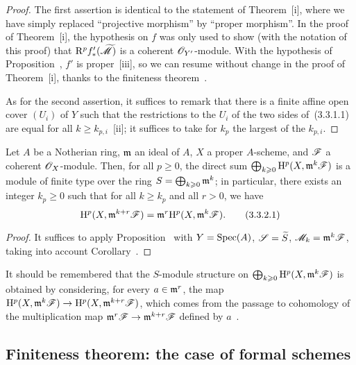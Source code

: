 \begin{proof}
\label{proof-3.3.3.1}
The first assertion is identical to the statement of Theorem~[i], where we have simply replaced ``projective morphism'' by ``proper morphism''.
In the proof of Theorem~[i], the hypothesis on $f$ was only used to show (with the notation of this proof) that $\mathrm{R}^p f_*'({\widetilde{\mathscr{M}}})$ is a coherent $\mathscr{O}_{Y'}$-module.
With the hypothesis of Proposition~, $f'$ is proper~[iii], so we can resume without change in the proof of Theorem~[i], thanks to the finiteness theorem~.

As for the second assertion, it suffices to remark that there is a finite affine open cover $(U_i)$ of $Y$ such that the restrictions to the $U_i$ of the two sides of~(3.3.1.1) are equal for all $k\geq k_{p,i}$~[ii]; it suffices to take for $k_p$ the largest of the $k_{p,i}$.
\end{proof}

\begin{cor}[3.3.2]
\label{3.3.3.2}
Let $A$ be a Notherian ring, $\mathfrak{m}$ an ideal of $A$, $X$ a proper $A$-scheme, and $\mathscr{F}$ a coherent $\mathscr{O}_X$-module.
Then, for all $p\geq 0$, the direct sum $\bigoplus_{k\geqslant 0}\mathrm{H}^p(X,\mathfrak{m}^k\mathscr{F})$ is a module of finite type over the ring $S=\bigoplus_{k\geqslant 0}\mathfrak{m}^k$; in particular, there exists an integer $k_p\geq 0$ such that for all $k\geq k_p$ and all $r>0$, we have
\[
\label{3.3.3.2.1}
  \mathrm{H}^p(X,\mathfrak{m}^{k+r}\mathscr{F})=\mathfrak{m}^r\mathrm{H}^p(X,\mathfrak{m}^k\mathscr{F}).
  \tag{3.3.2.1}
\]
\end{cor}

\begin{proof}
\label{proof-3.3.3.2}
It suffices to apply Proposition~ with $Y={\mathop{\mathrm{Spec}}\nolimits}(A)$, $\mathscr{S}={\widetilde{S}}$, $\mathscr{M}_k=\mathfrak{m}^k\mathscr{F}$, taking into account Corollary~.
\end{proof}

It should be remembered that the $S$-module structure on $\bigoplus_{k\geqslant 0}\mathrm{H}^p(X,\mathfrak{m}^k\mathscr{F})$ is obtained by considering, for every $a\in\mathfrak{m}^r$, the map $\HH^p(X,\fk{m}^k\sh{F})\to\HH^p(X,\fk{m}^{k+r}\sh{F})$, which comes from the passage to cohomology of the multiplication map $\fk{m}^r\sh{F}\to\fk{m}^{k+r}\sh{F}$ defined by $a$~.

\subsection{Finiteness theorem: the case of formal schemes}
\label{subsection:3.3.4}

